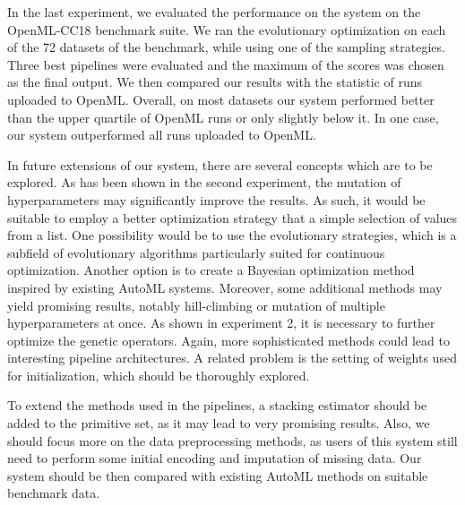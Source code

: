 In the last experiment, we evaluated the performance on the system on the OpenML-CC18 benchmark suite.
We ran the evolutionary optimization on each of the 72 datasets of the
benchmark, while using one of the sampling strategies. Three best pipelines were evaluated
and the maximum of the scores was chosen as the final output. We then compared our
results with the statistic of runs uploaded to OpenML. Overall, on most datasets
our system performed better than the upper quartile of OpenML runs or only slightly
below it. In one case, our system outperformed all runs uploaded to OpenML.

In future extensions of our system, there are several concepts which are to be
explored. As has been shown in the second experiment, the mutation of hyperparameters
may significantly improve the results. As such, it would be suitable to employ a
better optimization strategy that a simple selection of values from a list. One
possibility would be to use the evolutionary strategies, which is a subfield of
evolutionary algorithms particularly suited for continuous optimization. Another
option is to create a Bayesian optimization method inspired by existing AutoML
systems. Moreover, some additional methods may yield promising results, notably
hill-climbing or mutation of multiple hyperparameters at once.
As shown in experiment 2, it is necessary to further optimize the genetic operators.
Again, more sophisticated methods could lead to interesting pipeline architectures.
A related problem is the setting of weights used for initialization, which should be
thoroughly explored.

To extend the methods used in the pipelines, a stacking estimator should be added
to the primitive set, as it may lead to very promising results. Also, we should focus
more on the data preprocessing methods, as users of this system still need to perform
some initial encoding and imputation of missing data. Our system should be then
compared with existing AutoML methods on suitable benchmark data.





